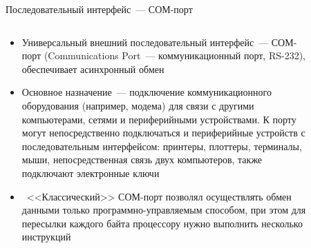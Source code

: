 \documentclass[aspectratio=169,14pt]{beamer}
\begin{document}
\begin{frame}{Последовательный интерфейс~--- СОМ-порт}
    \begin{columns}
        \begin{column}{0.7\textwidth}
            \begin{spacing}{0.8}
                \begin{footnotesize}
                    \begin{itemize}
                        \item Универсальный внешний последовательный интерфейс~--- СОМ-порт
                        (Communications Port~--- коммуникационный порт, RS-232),
                        обеспечивает асинхронный обмен
                        \item Основное назначение~--- подключение коммуникационного
                        оборудования (например, модема) для связи с другими компьютерами,
                        сетями и периферийными устройствами. К порту могут непосредственно
                        подключаться и периферийные устройств с последовательным
                        интерфейсом: принтеры, плоттеры, терминалы, мыши,
                        непосредственная связь двух компьютеров, также подключают
                        электронные ключи
                        \item ~<<Классический>> СОМ-порт позволял осуществлять обмен
                        данными только программно-управляемым способом, при этом для
                        пересылки каждого байта процессору нужно выполнить несколько
                        инструкций
                    \end{itemize}
                \end{footnotesize}
            \end{spacing}
        \end{column}
        \begin{column}{0.3\textwidth}
            \begin{figure}
                \centering
                \texttt{[image: COMPort.png]}
                \caption{\footnotesize{Разъем COM-порта}}
            \end{figure}
        \end{column}
    \end{columns}
\end{frame}
\end{document}
